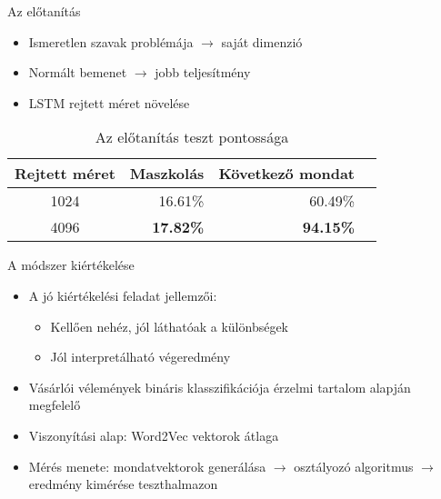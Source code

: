 \documentclass{beamer}
\begin{document}
\begin{frame}{Az előtanítás}
	
\begin{itemize}
	\item Ismeretlen szavak problémája $\rightarrow$ saját dimenzió
	\item Normált bemenet $\rightarrow$ jobb teljesítmény
	\item LSTM rejtett méret növelése
\end{itemize}


	\begin{table}
		\centering
		\begin{tabular}{ | c | r | r | r |}
			\hline
			\textbf{Rejtett méret} & \textbf{Maszkolás} & \textbf{Következő mondat} \\
			\hline \hline		
			1024 & 16.61\% & 60.49\% \\
			\hline
			4096 & \textbf{17.82\%} & \textbf{94.15\%} \\
			\hline
		\end{tabular}
		\caption{Az előtanítás teszt pontossága}

	\end{table}
	
	
\end{frame}




\begin{frame}{A módszer kiértékelése}
	
\begin{itemize}
	\item A jó kiértékelési feladat jellemzői:
	\begin{itemize}
		\item Kellően nehéz, jól láthatóak a különbségek
		\item Jól interpretálható végeredmény
	\end{itemize}
	\item Vásárlói vélemények bináris klasszifikációja érzelmi tartalom alapján megfelelő
	\item Viszonyítási alap: Word2Vec vektorok átlaga
	\item Mérés menete: mondatvektorok generálása $\rightarrow$ osztályozó algoritmus $\rightarrow$ eredmény kimérése teszthalmazon
\end{itemize}	
	
\end{frame}
\end{document}
